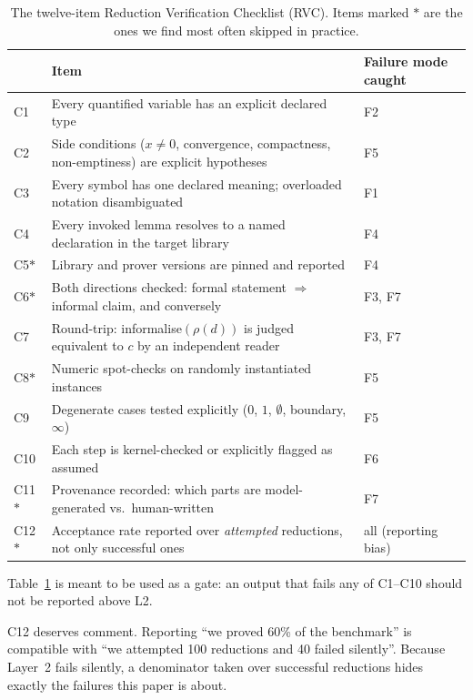 \documentclass[11pt,a4paper]{article}
\theoremstyle{plain}
\theoremstyle{remark}
\newcommand{\red}{\rho}                 %
\begin{document}
\begin{table}[t]
\caption{The twelve-item Reduction Verification Checklist (RVC).  Items marked
  $\ast$ are the ones we find most often skipped in practice.}
\label{tab:checklist}
\centering\small
\begin{tabular}{@{}p{0.6cm}p{7.6cm}p{3.6cm}@{}}
\toprule
& \textbf{Item} & \textbf{Failure mode caught}\\
\midrule
C1  & Every quantified variable has an explicit declared type & F2 \\
C2  & Side conditions ($x\neq 0$, convergence, compactness, non-emptiness) are explicit hypotheses & F5 \\
C3  & Every symbol has one declared meaning; overloaded notation disambiguated & F1 \\
C4  & Every invoked lemma resolves to a named declaration in the target library & F4 \\
C5$\ast$ & Library and prover versions are pinned and reported & F4 \\
C6$\ast$ & Both directions checked: formal statement $\Rightarrow$ informal claim, and conversely & F3, F7 \\
C7  & Round-trip: informalise$(\red(d))$ is judged equivalent to $c$ by an independent reader & F3, F7 \\
C8$\ast$ & Numeric spot-checks on randomly instantiated instances & F5 \\
C9  & Degenerate cases tested explicitly ($0$, $1$, $\emptyset$, boundary, $\infty$) & F5 \\
C10 & Each step is kernel-checked or explicitly flagged as assumed & F6 \\
C11$\ast$ & Provenance recorded: which parts are model-generated vs.\ human-written & F7 \\
C12$\ast$ & Acceptance rate reported over \emph{attempted} reductions, not only successful ones & all (reporting bias) \\
\bottomrule
\end{tabular}
\end{table}

Table~\ref{tab:checklist} is meant to be used as a gate: an output that fails
any of C1--C10 should not be reported above L2.

C12 deserves comment.  Reporting ``we proved 60\% of the benchmark'' is
compatible with ``we attempted 100 reductions and 40 failed silently''.  Because
Layer~2 fails silently, a denominator taken over successful reductions hides
exactly the failures this paper is about.
\end{document}
